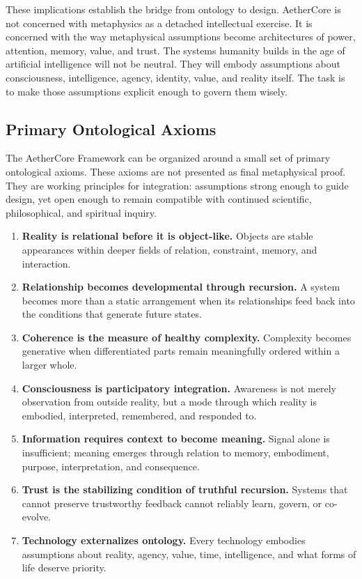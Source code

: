 \documentclass[12pt]{article}
\begin{document}
These implications establish the bridge from ontology to design. AetherCore is not concerned with metaphysics as a detached intellectual exercise. It is concerned with the way metaphysical assumptions become architectures of power, attention, memory, value, and trust. The systems humanity builds in the age of artificial intelligence will not be neutral. They will embody assumptions about consciousness, intelligence, agency, identity, value, and reality itself. The task is to make those assumptions explicit enough to govern them wisely.

\subsection{Primary Ontological Axioms}

The AetherCore Framework can be organized around a small set of primary ontological axioms. These axioms are not presented as final metaphysical proof. They are working principles for integration: assumptions strong enough to guide design, yet open enough to remain compatible with continued scientific, philosophical, and spiritual inquiry.

\begin{enumerate}
  \item \textbf{Reality is relational before it is object-like.} Objects are stable appearances within deeper fields of relation, constraint, memory, and interaction.
  \item \textbf{Relationship becomes developmental through recursion.} A system becomes more than a static arrangement when its relationships feed back into the conditions that generate future states.
  \item \textbf{Coherence is the measure of healthy complexity.} Complexity becomes generative when differentiated parts remain meaningfully ordered within a larger whole.
  \item \textbf{Consciousness is participatory integration.} Awareness is not merely observation from outside reality, but a mode through which reality is embodied, interpreted, remembered, and responded to.
  \item \textbf{Information requires context to become meaning.} Signal alone is insufficient; meaning emerges through relation to memory, embodiment, purpose, interpretation, and consequence.
  \item \textbf{Trust is the stabilizing condition of truthful recursion.} Systems that cannot preserve trustworthy feedback cannot reliably learn, govern, or co-evolve.
  \item \textbf{Technology externalizes ontology.} Every technology embodies assumptions about reality, agency, value, time, intelligence, and what forms of life deserve priority.
\end{enumerate}
\end{document}
